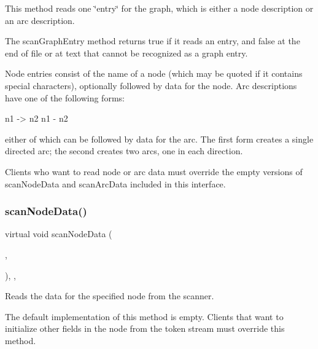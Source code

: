 This method reads one \char`\"{}entry\char`\"{} for the graph, which is either a node description or an arc description. 

The {\ttfamily scan\+Graph\+Entry} method returns {\ttfamily true} if it reads an entry, and {\ttfamily false} at the end of file or at text that cannot be recognized as a graph entry.

Node entries consist of the name of a node (which may be quoted if it contains special characters), optionally followed by data for the node. Arc descriptions have one of the following forms\+:


\begin{DoxyPre}
n1 -> n2
n1 - n2
\end{DoxyPre}


either of which can be followed by data for the arc. The first form creates a single directed arc; the second creates two arcs, one in each direction.

Clients who want to read node or arc data must override the empty versions of {\ttfamily scan\+Node\+Data} and {\ttfamily scan\+Arc\+Data} included in this interface. \mbox{\label{classGraph_a0fc2ca3535b7bff7759aa0c1d35ff08b}} 
\subsubsection{\texorpdfstring{scan\+Node\+Data()}{scanNodeData()}}
{\footnotesize\ttfamily virtual void scan\+Node\+Data (\begin{DoxyParamCaption}\item[{\mbox{\hyperlink{classTokenScanner}{Token\+Scanner}} \&}]{,  }\item[{\mbox{\hyperlink{classVertexGen}{Vertex\+Gen}}$<$ V, E $>$  $\ast$}]{ }\end{DoxyParamCaption})\hspace{0.3cm}{\ttfamily [inline]}, {\ttfamily [virtual]}, {\ttfamily [inherited]}}



Reads the data for the specified node from the scanner. 

The default implementation of this method is empty. Clients that want to initialize other fields in the node from the token stream must override this method. \mbox{\label{classGraph_af9593d4a5ff4274efaf429cb4f9e57cc}} 
